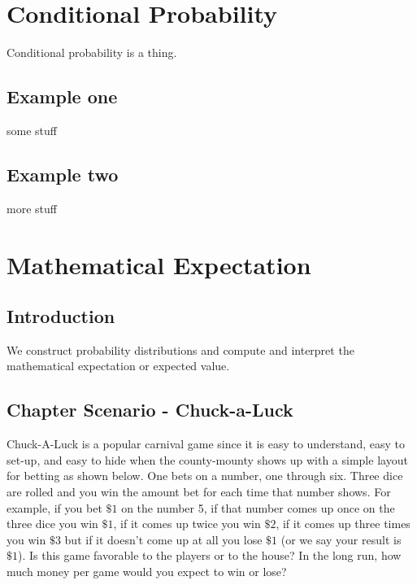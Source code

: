 \documentclass[]{book}
\theoremstyle{definition}
\theoremstyle{definition}
\theoremstyle{definition}
\theoremstyle{remark}
\begin{document}
\chapter{Conditional Probability}\label{conditional}

Conditional probability is a thing.

\section{Example one}\label{example-one}

some stuff

\section{Example two}\label{example-two}

more stuff

\chapter{Mathematical Expectation}\label{expectation}

\section{Introduction}\label{introduction}

We construct probability distributions and compute and interpret the
mathematical expectation or expected value.

\section{Chapter Scenario -
Chuck-a-Luck}\label{chapter_scenario_chuckaluck}

Chuck-A-Luck is a popular carnival game since it is easy to understand,
easy to set-up, and easy to hide when the county-mounty shows up with a
simple layout for betting as shown below. One bets on a number, one
through six. Three dice are rolled and you win the amount bet for each
time that number shows. For example, if you bet \(\$1\) on the number 5,
if that number comes up once on the three dice you win \(\$1\), if it
comes up twice you win \(\$2\), if it comes up three times you win
\(\$3\) but if it doesn't come up at all you lose \(\$1\) (or we say
your result is \(\$1\)). Is this game favorable to the players or to the
house? In the long run, how much money per game would you expect to win
or lose?
\end{document}
